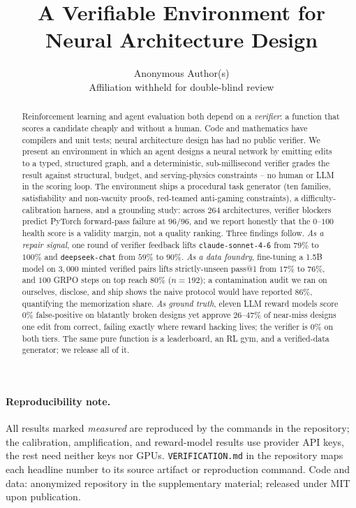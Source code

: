 \documentclass{article}
\title{A Verifiable Environment for Neural Architecture Design}
\author{Anonymous Author(s)\\ Affiliation withheld for double-blind review}
\date{}  %
\begin{document}
\maketitle

\begin{abstract}
Reinforcement learning and agent evaluation both depend on a \emph{verifier}: a function that scores a candidate cheaply and without a human. Code and mathematics have compilers and unit tests; neural architecture design has had no public verifier. We present an environment in which an agent designs a neural network by emitting edits to a typed, structured graph, and a deterministic, sub-millisecond verifier grades the result against structural, budget, and serving-physics constraints -- no human or LLM in the scoring loop. The environment ships a procedural task generator (ten families, satisfiability and non-vacuity proofs, red-teamed anti-gaming constraints), a difficulty-calibration harness, and a grounding study: across $264$ architectures, verifier blockers predict PyTorch forward-pass failure at $96/96$, and we report honestly that the $0$--$100$ health score is a validity margin, not a quality ranking. Three findings follow. \emph{As a repair signal}, one round of verifier feedback lifts \texttt{claude-sonnet-4-6} from $79\%$ to $100\%$ and \texttt{deepseek-chat} from $59\%$ to $90\%$. \emph{As a data foundry}, fine-tuning a 1.5B model on $3{,}000$ minted verified pairs lifts strictly-unseen pass@1 from $17\%$ to $76\%$, and $100$ GRPO steps on top reach $80\%$ ($n{=}192$); a contamination audit we ran on ourselves, disclose, and ship shows the naive protocol would have reported $86\%$, quantifying the memorization share. \emph{As ground truth}, eleven LLM reward models score $0\%$ false-positive on blatantly broken designs yet approve $26$--$47\%$ of near-miss designs one edit from correct, failing exactly where reward hacking lives; the verifier is $0\%$ on both tiers. The same pure function is a leaderboard, an RL gym, and a verified-data generator; we release all of it.
\end{abstract}

\paragraph{Reproducibility note.} All results marked \emph{measured} are reproduced by the commands in the repository; the calibration, amplification, and reward-model results use provider API keys, the rest need neither keys nor GPUs. \texttt{VERIFICATION.md} in the repository maps each headline number to its source artifact or reproduction command. Code and data: anonymized repository in the supplementary material; released under MIT upon publication.
\end{document}
